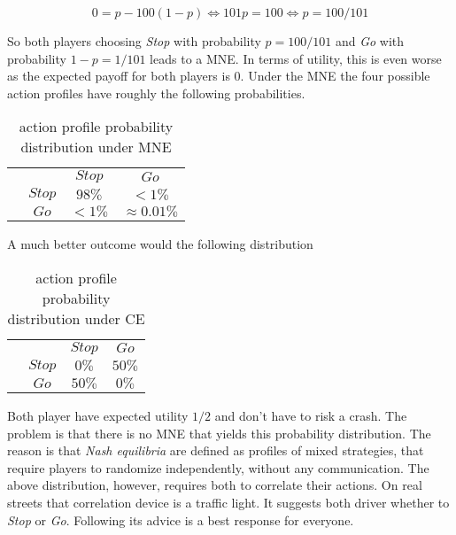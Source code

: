 \begin{equation*}
    0 = p - 100(1-p) \iff 101p = 100 \iff p = 100/101
\end{equation*}

So both players choosing \textit{Stop} with probability $p = 100/101$ and \textit{Go} with probability $1-p = 1/101$  leads to a MNE. In terms of utility, this is even worse as the expected payoff for both players is $0$. Under the MNE the four possible action
profiles have roughly the following probabilities. 

\begin{table}[H]\centering
\setlength{\extrarowheight}{2pt}
\begin{tabular}{cc|c|c|}
  & \multicolumn{1}{c}{} & \multicolumn{1}{c}{$Stop$}  & \multicolumn{1}{c}{$Go$} \\\cline{3-4}
  & $Stop$ & $98\%$ & $<1\%$ \\\cline{3-4}
  & $Go$ & $<1\%$ & $\approx 0.01\%$ \\\cline{3-4}
\end{tabular}\caption{\label{tab:probabilityUnderMNE}action profile probability distribution under MNE}
\end{table}

A much better outcome would the following distribution

\begin{table}[H]\centering
\setlength{\extrarowheight}{2pt}
\begin{tabular}{cc|c|c|}
  & \multicolumn{1}{c}{} & \multicolumn{1}{c}{$Stop$}  & \multicolumn{1}{c}{$Go$} \\\cline{3-4}
  & $Stop$ & $0\%$ & $50\%$ \\\cline{3-4}
  & $Go$ & $50\%$ & $0\%$ \\\cline{3-4}
\end{tabular}\caption{\label{tab:probabilityUnderCE}action profile probability distribution under CE}
\end{table}

Both player have expected utility $1/2$ and don't have to risk a crash. The problem is that there is no MNE that yields this probability distribution. The reason is that \textit{Nash equilibria} are defined as profiles of mixed strategies, that require players to randomize independently, without any
communication. The above distribution, however, requires both to correlate their actions. On real streets that correlation device is a traffic light. It suggests both driver whether to \textit{Stop} or \textit{Go}. Following its advice is a best response for everyone. \\

